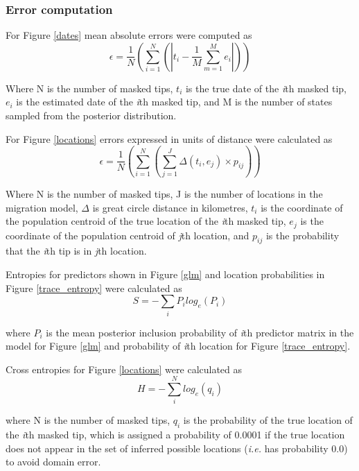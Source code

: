 \documentclass{bmcart}
\begin{document}
\subsubsection*{Error computation}
For Figure \ref{dates} mean absolute errors were computed as
\begin{equation}
    \epsilon = \frac{1}{N} (\sum_{i=1}^{N} (| t_{i} - \frac{1}{M} \sum_{m=1}^{M} e_{i}|))
\end{equation}

Where N is the number of masked tips, $t_{i}$ is the true date of the \textit{i}th masked tip, $e_{i}$ is the estimated date of the \textit{i}th masked tip, and M is the number of states  sampled from the posterior distribution.

For Figure \ref{locations} errors expressed in units of distance were calculated as
\begin{equation}
  \epsilon = \frac{1}{N} (\sum_{i=1}^{N} (\sum_{j=1}^{J} \Delta(t_{i},e_{j})\times p_{ij}))
\end{equation}

Where N is the number of masked tips, J is the number of locations in the migration model, $\Delta$ is great circle distance in kilometres, $t_{i}$ is the coordinate of the population centroid of the true location of the \textit{i}th masked tip, $e_{j}$ is the coordinate of the population centroid of \textit{j}th location, and $p_{ij}$ is the probability that the \textit{i}th tip is in \textit{j}th location.

Entropies for predictors shown in Figure \ref{glm} and location probabilities in Figure \ref{trace_entropy} were calculated as
\begin{equation}
  S = -\sum_{i} P_{i} log_{e}(P_{i})
\end{equation}

where $P_{i}$ is the mean posterior inclusion probability of \textit{i}th predictor matrix in the model for Figure \ref{glm} and probability of \textit{i}th location for Figure \ref{trace_entropy}.

Cross entropies for Figure \ref{locations} were calculated as
\begin{equation}
  H = -\sum_{i}^{N} log_{e}(q_{i})
\end{equation}

where N is the number of masked tips, $q_{i}$ is the probability of the true location of the \textit{i}th masked tip, which is assigned a probability of 0.0001 if the true location does not appear in the set of inferred possible locations (\textit{i.e.} has probability 0.0) to avoid domain error.
\end{document}
